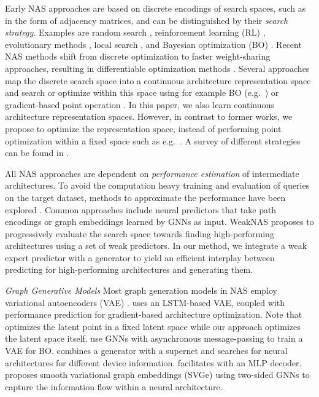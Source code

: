 \documentclass[runningheads]{llncs}
\begin{document}
Early NAS approaches are based on discrete encodings of search spaces, such as in the form of adjacency matrices, and can be distinguished by their \emph{search strategy}.
Examples are random search \cite{2012RandomNAS,2019RS}, reinforcement learning (RL) \cite{2017ReinforcementNAS,2018ReinforcementNAS}, evolutionary methods \cite{2017EvolutionaryNAS,2019EvolutionaryNAS}, local search \cite{2020LocalSearchNAS}, and Bayesian optimization (BO) \cite{2018BONAS,2020BONAS}.
Recent NAS methods shift from discrete optimization to faster weight-sharing approaches, resulting in differentiable optimization methods \cite{2018ParameterSharingNAS,2018DARTS,2018ONESHOT,2019ProxyNAS,2019SNAS,2020RobustDarts}.
Several approaches map the discrete search space into a continuous architecture representation space \cite{2018NAO,2019VAENAS,2020Arch2vec,2021SVGe} and search or optimize within this space using for example BO (e.g.~\cite{2020Arch2vec}) or gradient-based point operation \cite{2018NAO}. 
In this paper, we also learn continuous architecture representation spaces.
However, in contrast to former works, we propose to optimize the representation space, instead of performing point optimization within a fixed space such as e.g.~\cite{2018NAO}. 
A survey of different strategies can be found in \cite{2019NASSurvey}.

All NAS approaches are dependent on \emph{performance estimation} of intermediate architectures.
To avoid the computation heavy training and evaluation of queries on the target dataset, methods to approximate the performance have been explored \cite{2021HowPP}.
Common approaches include neural predictors that take path encodings \cite{2021BANANAS} or graph embeddings learned by GNNs \cite{2019NASPredictor,2020NP} as input.
WeakNAS \cite{2021WeakNAS} proposes to progressively evaluate the search space towards finding high-performing architectures using a set of weak predictors. 
In our method, we integrate a weak expert predictor with a generator to yield an efficient interplay between predicting for high-performing architectures and generating them.   

\noindent\textit{Graph Generative Models}
Most graph generation models in NAS employ variational autoencoders (VAE) \cite{2014VAE}. 
\cite{2018NAO} uses an LSTM-based VAE, coupled with performance prediction for gradient-based architecture optimization. Note that \cite{2018NAO} optimizes the latent point in a fixed latent space while our approach optimizes the latent space itself. 
\cite{2019VAENAS} use GNNs with asynchronous message-passing to train a VAE for BO.
\cite{2021SGNAS} combines a generator with a supernet and searches for neural architectures for different device information.
\cite{2020Arch2vec} facilitates \cite{2019GIN} with an MLP decoder.
\cite{2021SVGe} proposes smooth variational graph embeddings (SVGe) using two-sided GNNs to capture the information flow within a neural architecture.
\end{document}
